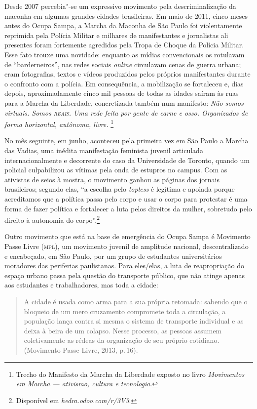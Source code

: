Desde 2007 percebia"-se um expressivo movimento pela descriminalização da
maconha em algumas grandes cidades brasileiras. Em maio de 2011, cinco
meses antes do Ocupa Sampa, a Marcha da Maconha de São Paulo foi
violentamente reprimida pela Polícia Militar e milhares de manifestantes
e jornalistas ali presentes foram fortemente agredidos pela Tropa de
Choque da Polícia Militar. Esse fato trouxe uma novidade: enquanto as
mídias convencionais os rotulavam de ``barderneiros'', nas redes sociais
\textit{online} circulavam cenas de guerra urbana; eram fotografias,
textos e vídeos produzidos pelos próprios manifestantes durante o
confronto com a polícia. Em consequência, a mobilização se fortaleceu e,
dias depois, aproximadamente cinco mil pessoas de todas as idades saíram
às ruas para a Marcha da Liberdade, concretizada também num manifesto:
\textit{Não somos virtuais. Somos \textsc{reais}. Uma rede feita por gente de
carne e osso. Organizados de forma horizontal, autônoma, livre.}
\footnote{Trecho do Manifesto da Marcha da Liberdade exposto no livro
  \textit{Movimentos em Marcha --- ativismo, cultura e tecnologia}.}

No mês seguinte, em junho, aconteceu pela primeira vez em São Paulo a
Marcha das Vadias, uma inédita manifestação feminista juvenil articulada
internacionalmente e decorrente do caso da Universidade de Toronto,
quando um policial culpabilizou as vítimas pela onda de estupros no
campus. Com as ativistas de seios à mostra, o movimento ganhou as
páginas dos jornais brasileiros; segundo elas, ``a escolha pelo
\textit{topless} é legítima e apoiada porque acreditamos que a política
passa pelo corpo e usar o corpo para protestar é uma forma de fazer
política e fortalecer a luta pelos direitos da mulher, sobretudo pelo
direito à autonomia do corpo''.\footnote{Disponível em \textit{hedra.odoo.com/r/3V3}.}

Outro movimento que está na base de emergência do Ocupa Sampa é
Movimento Passe Livre (\textsc{mpl}), um movimento juvenil de
amplitude nacional, descentralizado e encabeçado, em São Paulo, por um
grupo de estudantes universitários moradores das periferias
paulistanas. Para eles/elas, a luta de reapropriação do espaço urbano
passa pela questão do transporte público, que não atinge apenas aos
estudantes e trabalhadores, mas toda a cidade:

\begin{quote}
A cidade é usada como arma para a sua própria retomada: sabendo que o
bloqueio de um mero cruzamento compromete toda a circulação, a população
lança contra si mesma o sistema de transporte individual e as deixa à
beira de um colapso. Nesse processo, as pessoas assumem coletivamente as
rédeas da organização de seu próprio cotidiano. (Movimento Passe Livre,
2013, p.\,16).
\end{quote}

